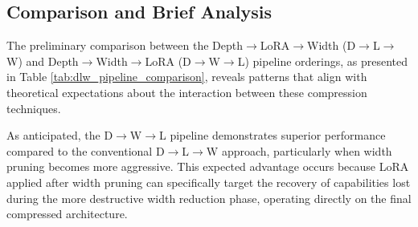 \subsection{Comparison and Brief Analysis}

The preliminary comparison between the Depth$\rightarrow$LoRA$\rightarrow$Width (D$\rightarrow$L$\rightarrow$W) and Depth$\rightarrow$Width$\rightarrow$LoRA (D$\rightarrow$W$\rightarrow$L) pipeline orderings, as presented in Table \ref{tab:dlw_pipeline_comparison}, reveals patterns that align with theoretical expectations about the interaction between these compression techniques.

As anticipated, the D$\rightarrow$W$\rightarrow$L pipeline demonstrates superior performance compared to the conventional D$\rightarrow$L$\rightarrow$W approach, particularly when width pruning becomes more aggressive. This expected advantage occurs because LoRA applied after width pruning can specifically target the recovery of capabilities lost during the more destructive width reduction phase, operating directly on the final compressed architecture.

